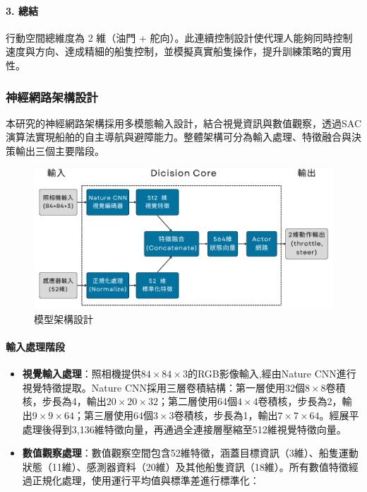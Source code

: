 \documentclass[12pt,a4paper]{article}
\begin{document}
\paragraph{3. 總結}
行動空間總維度為 2 維（油門 + 舵向）。此連續控制設計使代理人能夠同時控制速度與方向、達成精細的船隻控制，並模擬真實船隻操作，提升訓練策略的實用性。

\subsubsection{神經網路架構設計}

本研究的神經網路架構採用多模態輸入設計，結合視覺資訊與數值觀察，透過SAC演算法實現船舶的自主導航與避障能力。整體架構可分為輸入處理、特徵融合與決策輸出三個主要階段。

\vspace*{0.5cm}

\begin{figure}[h]
    \centering
    \begin{minipage}[t]{1\textwidth}
        \centering
        \includegraphics[width=\textwidth]{image/ModelArch.png}
        \caption{模型架構設計}
    \end{minipage}
\end{figure}

\paragraph{輸入處理階段}
\begin{itemize}
	\item \textbf{視覺輸入處理}：照相機提供$84\times84\times3$的RGB影像輸入,經由Nature CNN進行視覺特徵提取。Nature CNN採用三層卷積結構：第一層使用32個$8\times8$卷積核，步長為4，輸出$20\times20\times32$；第二層使用64個$4\times4$卷積核，步長為2，輸出$9\times9\times64$；第三層使用64個$3\times3$卷積核，步長為1，輸出$7\times7\times64$。經展平處理後得到3,136維特徵向量，再通過全連接層壓縮至512維視覺特徵向量。
	\item \textbf{數值觀察處理}：數值觀察空間包含52維特徵，涵蓋目標資訊（3維）、船隻運動狀態（11維）、感測器資料（20維）及其他船隻資訊（18維）。所有數值特徵經過正規化處理，使用運行平均值與標準差進行標準化：
\end{itemize}
\end{document}

